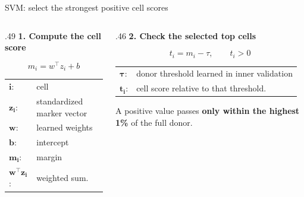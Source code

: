 \documentclass[aspectratio=169,10pt]{beamer}
\newcommand{\eyebrow}[1]{{\color{Teal}\bfseries #1}\par\smallskip}
\newcommand{\compactmath}{%
  \setlength{\abovedisplayskip}{4pt}\setlength{\belowdisplayskip}{4pt}%
  \setlength{\abovedisplayshortskip}{2pt}\setlength{\belowdisplayshortskip}{4pt}}
\begin{document}
\begin{frame}[t]{SVM: select the strongest positive cell scores}
  \relax
  {\centering
  \par}\smallskip
  \begin{columns}[T,onlytextwidth]
    \begin{column}{.49\textwidth}
      \eyebrow{1. Compute the cell score}
      \compactmath
      \[m_i=w^\top z_i+b\]
      {\small\begin{tabular}{@{}l@{\quad}>{\raggedright\arraybackslash}p{.78\linewidth}@{}}
        $\boldsymbol{i}$: & cell\\
        $\boldsymbol{z_i}$: & standardized marker vector\\
        $\boldsymbol{w}$: & learned weights\\
        $\boldsymbol{b}$: & intercept\\
        $\boldsymbol{m_i}$: & margin\\
        $\boldsymbol{w^\top z_i}$: & weighted sum.
      \end{tabular}}
    \end{column}
    \begin{column}{.46\textwidth}
      \eyebrow{2. Check the selected top cells}
      \compactmath
      \[t_i=m_i-\tau,\qquad t_i>0\]
      {\small\begin{tabular}{@{}l@{\quad}>{\raggedright\arraybackslash}p{.78\linewidth}@{}}
        $\boldsymbol{\tau}$: & donor threshold learned in inner validation\\
        $\boldsymbol{t_i}$: & cell score relative to that threshold.
      \end{tabular}}\par\smallskip
      \small A positive value passes \textbf{only within the highest 1\%} of the full donor.
    \end{column}
  \end{columns}
\end{frame}
\end{document}
